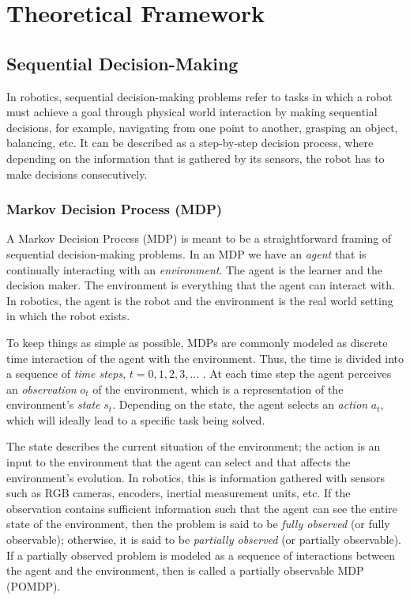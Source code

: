 \chapter{Theoretical Framework}
\section{Sequential Decision-Making}
In robotics, sequential decision-making problems refer to tasks in which a robot must achieve a goal through physical world interaction by making sequential decisions, for example, navigating from one point to another, grasping an object, balancing, etc. It can be described as a step-by-step decision process, where depending on the information that is gathered by its sensors, the robot has to make decisions consecutively.

\subsection[Markov Decision Process (MDP)]{Markov Decision Process (MDP) \cite{puterman2014markov, sutton2018reinforcement}}
A Markov Decision Process (MDP) is meant to be a straightforward framing of sequential decision-making problems. In an MDP we have an \emph{agent} that is continually interacting with an \emph{environment}. The agent is the learner and the decision maker. The environment is everything that the agent can interact with. In robotics, the agent is the robot and the environment is the real world setting in which the robot exists.

To keep things as simple as possible, MDPs are commonly modeled as discrete time interaction of the agent with the environment. Thus, the time is divided into a sequence of \emph{time steps}, $t=0,1,2,3,...$ . At each time step the agent perceives an \emph{observation} $o_{t}$ of the environment, which is a representation of the environment's \emph{state} $s_{t}$. Depending on the state, the agent selects an \emph{action} $a_{t}$, which will ideally lead to a specific task being solved. 

The state describes the current situation of the environment; the action is an input to the environment that the agent can select and that affects the environment's evolution. In robotics, this is information gathered with sensors such as RGB cameras, encoders, inertial measurement units, etc. If the observation contains sufficient information such that the agent can see the entire state of the environment, then the problem is said to be \emph{fully observed} (or fully observable); otherwise, it is said to be \emph{partially observed} (or partially observable). If a partially observed problem is modeled as a sequence of interactions between the agent and the environment, then is called a partially observable MDP (POMDP).

